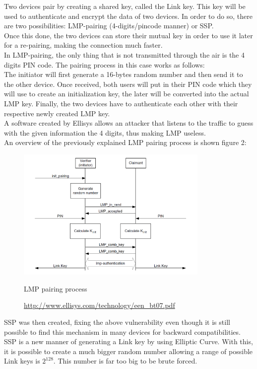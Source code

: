 Two devices pair by creating a shared key, called the Link key. This key will be used to authenticate and encrypt the data of two devices.
In order to do so, there are two possibilities: LMP-pairing (4-digits/pincode manner) or SSP. \\
Once this done, the two devices can store their mutual key in order to use it later for a re-pairing, making the connection much faster.\\
In LMP-pairing, the only thing that is not transmitted through the air is the 4 digits PIN code. The pairing process in this case works as follows: \\
The initiator will first generate a 16-bytes random number and then send it to the other device. Once received, both users will put in their PIN code which they will use to create an initialization key, the later will be converted into the actual LMP key. Finally, the two devices have to authenticate each other with their respective newly created LMP key. \\
A software created by Ellisys \cite{ellisys} allows an attacker that listens to the traffic to guess with the given information the 4 digits, thus making LMP useless. \\
An overview of the previously explained LMP pairing process is shown figure 2: 
\begin{figure}[!h]
  \begin{center}
	\includegraphics[width=350px]{images/haha.png}
	\label{LMP pairing}
	\caption{LMP pairing process}
	\caption*{\url{http://www.ellisys.com/technology/een_bt07.pdf}}
  \end{center}
\end{figure}


SSP was then created, fixing the above vulnerability even though it is still possible to find this mechanism in many devices for backward compatibilities. \\
SSP is a new manner of generating a Link key by using Elliptic Curve. With this, it is possible to create a much bigger random number allowing a range of possible Link keys is $2^{128}$. This number is far too big to be brute forced. 

